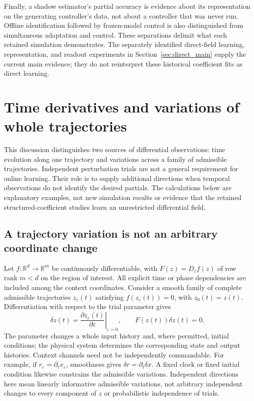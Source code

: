 \documentclass[journal]{IEEEtran}
\begin{document}
Finally, a shadow estimator's partial accuracy is evidence about its
representation on the generating controller's data, not about a controller
that was never run. Offline identification followed by frozen-model control
is also distinguished from simultaneous adaptation and control. These
separations delimit what each retained simulation demonstrates. The
separately identified direct-field learning, representation, and readout
experiments in Section~\ref{sec:direct_main} supply the current main evidence;
they do not reinterpret these historical coefficient fits as direct learning.
%

\section{Time derivatives and variations of whole trajectories}
\label{sec:trajectory_variations}
This discussion distinguishes two sources of differential observations:
time evolution along one trajectory and variations across a family of
admissible trajectories. Independent perturbation trials are not a general
requirement for online learning. Their role is to supply additional
directions when temporal observations do not identify the desired partials.
The calculations below are explanatory examples, not new simulation results
or evidence that the retained structured-coefficient studies learn an
unrestricted differential field.

\subsection{A trajectory variation is not an arbitrary coordinate change}
Let $f:\mathbb R^d\to\mathbb R^m$ be continuously differentiable, with
$F(z)=D_zf(z)$ of row rank $m<d$ on the region of interest. All explicit
time or phase dependencies are included among the context coordinates.
Consider a smooth family of complete admissible trajectories
$z_\varepsilon(t)$ satisfying $f(z_\varepsilon(t))=0$, with
$z_0(t)=z(t)$. Differentiation with respect to the trial parameter gives
\begin{equation}
 \delta z(t)=\left.\frac{\partial z_\varepsilon(t)}{\partial\varepsilon}
                    \right|_{\varepsilon=0},
 \qquad F(z(t))\delta z(t)=0.
 \label{eq:tv_family}
\end{equation}
The parameter changes a whole input history and, where permitted, initial
conditions; the physical system determines the corresponding state and
output histories. Context channels need not be independently commandable.
For example, if $r_\varepsilon=\partial_t x_\varepsilon$, smoothness gives
$\delta r=\partial_t\delta x$. A fixed clock or fixed initial condition
likewise constrains the admissible variations. Independent directions here
mean linearly informative admissible variations, not arbitrary independent
changes to every component of $z$ or probabilistic independence of trials.
\end{document}

